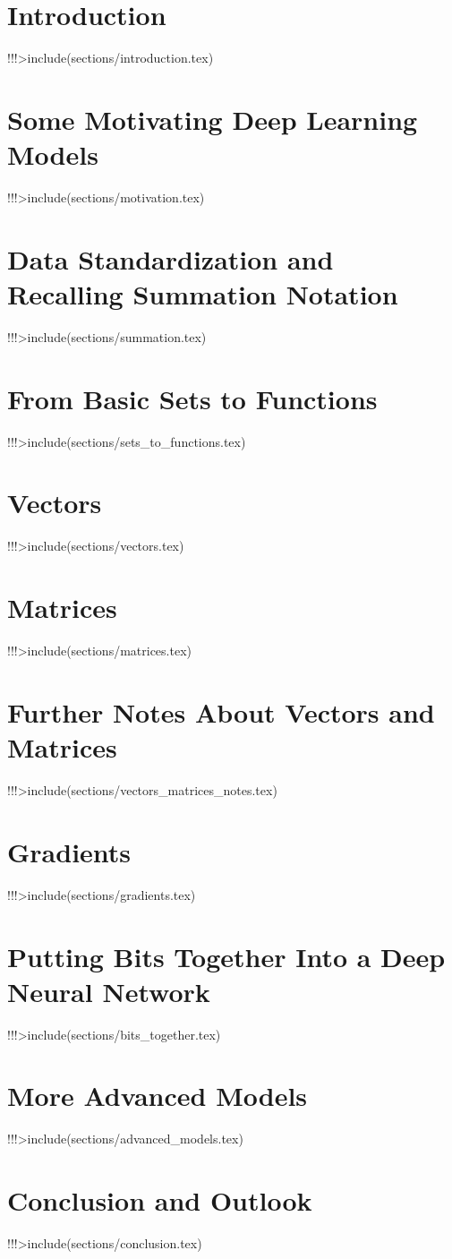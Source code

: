 \section{Introduction}
!!!>include(sections/introduction.tex)

\section{Some Motivating Deep Learning Models}
\label{sec:motivating-deep-learning-models}
!!!>include(sections/motivation.tex)

\section{Data Standardization and Recalling Summation Notation}
\label{sec:summation}
!!!>include(sections/summation.tex)

\section{From Basic Sets to Functions}
\label{sec:sets-and-functions}
!!!>include(sections/sets_to_functions.tex)

\section{Vectors}
\label{sec:vectors}
!!!>include(sections/vectors.tex)

\section{Matrices}
\label{sec:matrices}
!!!>include(sections/matrices.tex)

\section{Further Notes About Vectors and Matrices}
\label{sec:further-notes}
!!!>include(sections/vectors_matrices_notes.tex)

\section{Gradients}
\label{sec:gradient}
!!!>include(sections/gradients.tex)

\section{Putting Bits Together Into a Deep Neural Network}
\label{sec:putting-bits-together}
!!!>include(sections/bits_together.tex)

\section{More Advanced Models}
\label{sec:more-advanced-models}
!!!>include(sections/advanced_models.tex)

\section{Conclusion and Outlook}
\label{sec:conclusion}
!!!>include(sections/conclusion.tex)
